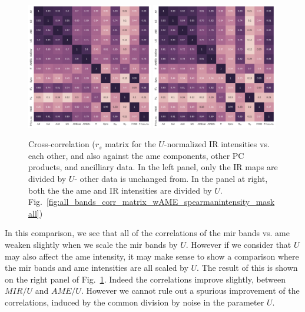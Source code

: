                 \begin{figure}
                    \includegraphics[width=0.49\textwidth,trim={0.2cm 0 0.25cm 0 },clip]{../Plots/ch_allsky/all_bands_corr_matrix_wAME_spearmanU_norm_masked.pdf}
                    \includegraphics[width=0.49\textwidth,trim={0.2cm 0 0.25cm 0 },clip]{../Plots/ch_allsky/all_bands_corr_matrix_wAME_spearmanU_norm_AMEnorm_masked.pdf}
                    \centering
                    \caption{Cross-correlation ($r_{s}$ matrix for the $U$-normalized IR intensities vs. each other, and also against the \gls{ame} components, other PC products, and ancilliary data. In the left panel, only the IR maps are divided by $U$- other data is unchanged from. In the panel at right, both the the \gls{ame} and IR intensities are divided by $U$. Fig.~\ref{fig:all_bands_corr_matrix_wAME_spearmanintensity_maskall})}
                    \label{fig:all_bands_corr_matrix_wAME_spearmanU_norm_masked}
                \end{figure}
            In this comparison, we see that all of the correlations of the \gls{mir} bands vs. \gls{ame} weaken slightly when we scale the \gls{mir} bands by $U$. However if we consider that $U$ may also affect the \gls{ame} intensity, it may make sense to show a comparison where the \gls{mir} bands and \gls{ame} intensities are all scaled by $U$. The result of this is shown on the right panel of Fig.~\ref{fig:all_bands_corr_matrix_wAME_spearmanU_norm_masked}. Indeed the correlations improve slightly, between $MIR/U$ and $AME/U$. However we cannot rule out a spurious improvement of the correlations, induced by the common division by noise in the parameter $U$.

